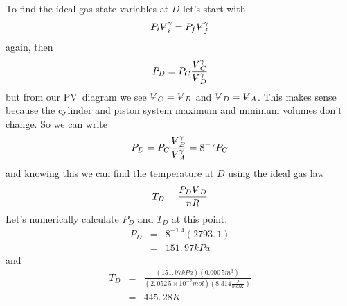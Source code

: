 \documentclass{article}
\begin{document}
To find the ideal gas state variables at $D$ let's start with 
\[
P_{i}%
\ooalign{\hfil$V$\hfil\cr\kern0.1em--\hfil\cr}%
_{i}^{\gamma }=P_{f}%
\ooalign{\hfil$V$\hfil\cr\kern0.1em--\hfil\cr}%
_{f}^{\gamma } 
\]%
again, then 
\[
P_{D}=P_{C}\frac{%
\ooalign{\hfil$V$\hfil\cr\kern0.1em--\hfil\cr}%
_{C}^{\gamma }}{%
\ooalign{\hfil$V$\hfil\cr\kern0.1em--\hfil\cr}%
_{D}^{\gamma }} 
\]%
but from our PV\ diagram we see $%
\ooalign{\hfil$V$\hfil\cr\kern0.1em--\hfil\cr}%
_{C}=%
\ooalign{\hfil$V$\hfil\cr\kern0.1em--\hfil\cr}%
_{B}$ and $%
\ooalign{\hfil$V$\hfil\cr\kern0.1em--\hfil\cr}%
_{D}=%
\ooalign{\hfil$V$\hfil\cr\kern0.1em--\hfil\cr}%
_{A}$. This makes sense because the cylinder and piston system maximum and
minimum volumes don't change. So we can write%
\[
P_{D}=P_{C}\frac{%
\ooalign{\hfil$V$\hfil\cr\kern0.1em--\hfil\cr}%
_{B}^{\gamma }}{%
\ooalign{\hfil$V$\hfil\cr\kern0.1em--\hfil\cr}%
_{A}^{\gamma }}=8^{-\gamma }P_{C} 
\]%
and knowing this we can find the temperature at $D$ using the ideal gas law%
\[
T_{D}=\frac{P_{D}%
\ooalign{\hfil$V$\hfil\cr\kern0.1em--\hfil\cr}%
_{D}}{nR} 
\]%
Let's numerically calculate $P_{D}$ and $T_{D}$ at this point.%
\begin{eqnarray*}
P_{D} &=&8^{-1.4}\left( 2793.\,\allowbreak 1\right) \\
&=&151.\,\allowbreak 97\unit{kPa}
\end{eqnarray*}%
and 
\begin{eqnarray*}
T_{D} &=&\frac{\left( 151.\,\allowbreak 97\unit{kPa}\right) \left( 0.000\,5%
\unit{m}^{3}\right) }{\left( 2.\,052\,5\times 10^{-2}\unit{mol}\right)
\left( 8.314\frac{\unit{J}}{\unit{mol}\unit{K}}\right) } \\
&=&445.\,\allowbreak 28\unit{K}
\end{eqnarray*}%
\end{document}
